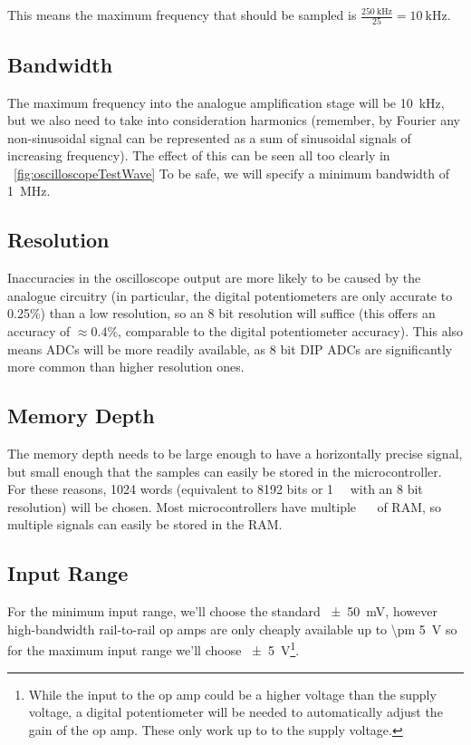 This means the maximum frequency that should be sampled is
$\frac{\SI{250}{\kHz}}{25} = \SI{10}{\kHz}$.

\subsection*{Bandwidth}

The maximum frequency into the analogue amplification stage will be
\SI{10}{\kHz}, but we also need to take into consideration harmonics (remember,
by Fourier any non-sinusoidal signal can be represented as a sum of sinusoidal
signals of increasing frequency). The effect of this can be seen all too clearly
in ~\cref{fig:oscilloscopeTestWave} To be safe, we will specify a minimum
bandwidth of \SI{1}{\MHz}.

\subsection*{Resolution}

Inaccuracies in the oscilloscope output are more likely to be caused by the
analogue circuitry (in particular, the digital potentiometers are only accurate
to 0.25\%) than a low resolution, so an 8 bit resolution will suffice (this
offers an accuracy of $\approx 0.4\%$, comparable to the digital potentiometer
accuracy). This also means ADCs will be more readily available, as 8 bit DIP
ADCs are significantly more common than higher resolution ones.

\subsection*{Memory Depth}

The memory depth needs to be large enough to have a horizontally precise signal,
but small enough that the samples can easily be stored in the microcontroller.
For these reasons, 1024 words (equivalent to 8192 bits or \SI{1}{\kilo\byte}
with an 8 bit resolution) will be chosen. Most microcontrollers have multiple
\SI{}{\kilo\byte} of RAM, so multiple signals can easily be stored in the
RAM.

\subsection*{Input Range}

For the minimum input range, we'll choose the standard \SI{\pm 50}{\mV}, however
high-bandwidth rail-to-rail op amps are only cheaply available up to \SI{\pm
5}{\V} so for the maximum input range we'll choose \SI{\pm 5}{\V}\footnote{While
  the input to the op amp could be a higher voltage than the supply voltage, a
digital potentiometer will be needed to automatically adjust the gain of the op
amp. These only work up to to the supply voltage.}.

